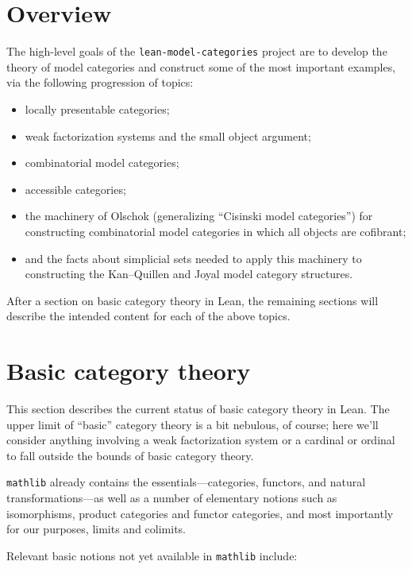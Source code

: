 \documentclass{article}
\theoremstyle{definition}
\theoremstyle{plain}
\newcommand{\mathlib}{\texttt{mathlib}}
\newcommand{\KQ}{Kan--Quillen}
\begin{document}
\section{Overview}

The high-level goals of the {\tt lean-model-categories} project are to develop the theory of model categories and construct some of the most important examples, via the following progression of topics:

\begin{itemize}
\item locally presentable categories;
\item weak factorization systems and the small object argument;
\item combinatorial model categories;
\item accessible categories;
\item the machinery of Olschok (generalizing ``Cisinski model categories'') for constructing combinatorial model categories in which all objects are cofibrant;
\item and the facts about simplicial sets needed to apply this machinery to constructing the \KQ{} and Joyal model category structures.
\end{itemize}

After a section on basic category theory in Lean, the remaining sections will describe the intended content for each of the above topics.

\section{Basic category theory}

This section describes the current status of basic category theory in Lean.
The upper limit of ``basic'' category theory is a bit nebulous, of course; here we'll consider anything involving a weak factorization system or a cardinal or ordinal to fall outside the bounds of basic category theory.

\mathlib{} already contains the essentials---categories, functors, and natural transformations---as well as a number of elementary notions such as isomorphisms, product categories and functor categories, and most importantly for our purposes, limits and colimits.

Relevant basic notions not yet available in \mathlib{} include:
\end{document}
